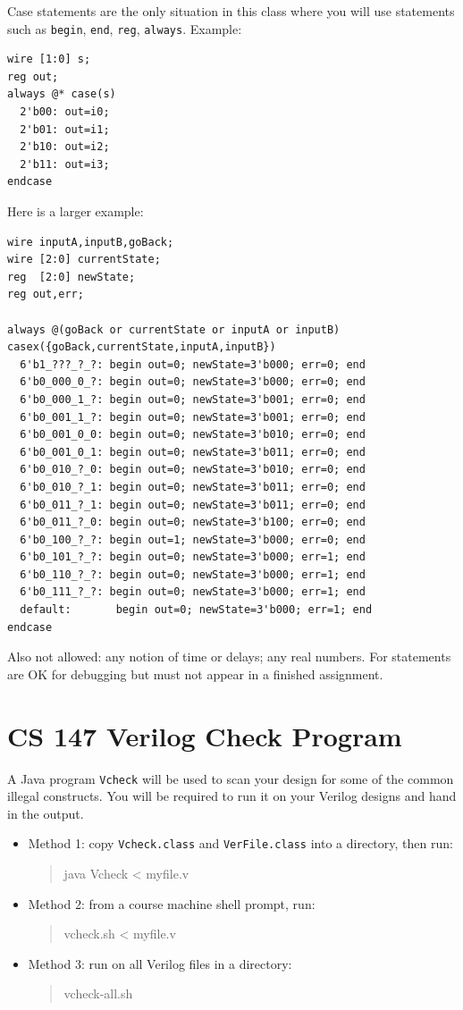 \documentclass[11pt]{article}
\begin{document}
Case statements are the only situation in this class where you will use statements such as
\texttt{begin}, \texttt{end}, \texttt{reg}, \texttt{always}. Example:
\begin{lstlisting}
wire [1:0] s;
reg out;
always @* case(s)
  2'b00: out=i0;
  2'b01: out=i1;
  2'b10: out=i2;
  2'b11: out=i3;
endcase
\end{lstlisting}

Here is a larger example:
\begin{lstlisting}
wire inputA,inputB,goBack;
wire [2:0] currentState;
reg  [2:0] newState;
reg out,err;

always @(goBack or currentState or inputA or inputB)
casex({goBack,currentState,inputA,inputB})
  6'b1_???_?_?: begin out=0; newState=3'b000; err=0; end
  6'b0_000_0_?: begin out=0; newState=3'b000; err=0; end
  6'b0_000_1_?: begin out=0; newState=3'b001; err=0; end
  6'b0_001_1_?: begin out=0; newState=3'b001; err=0; end
  6'b0_001_0_0: begin out=0; newState=3'b010; err=0; end
  6'b0_001_0_1: begin out=0; newState=3'b011; err=0; end
  6'b0_010_?_0: begin out=0; newState=3'b010; err=0; end
  6'b0_010_?_1: begin out=0; newState=3'b011; err=0; end
  6'b0_011_?_1: begin out=0; newState=3'b011; err=0; end
  6'b0_011_?_0: begin out=0; newState=3'b100; err=0; end
  6'b0_100_?_?: begin out=1; newState=3'b000; err=0; end
  6'b0_101_?_?: begin out=0; newState=3'b000; err=1; end
  6'b0_110_?_?: begin out=0; newState=3'b000; err=1; end
  6'b0_111_?_?: begin out=0; newState=3'b000; err=1; end
  default:       begin out=0; newState=3'b000; err=1; end
endcase
\end{lstlisting}

Also not allowed: any notion of time or delays; any real numbers.
For statements are OK for debugging but must not appear in a finished assignment.

\section{CS 147 Verilog Check Program}

A Java program \texttt{Vcheck} will be used to scan your design for some of the common illegal constructs.
You will be required to run it on your Verilog designs and hand in the output.

\begin{itemize}
  \item Method 1: copy \texttt{Vcheck.class} and \texttt{VerFile.class} into a directory, then run:
\begin{quote}\ttfamily
java Vcheck < myfile.v
\end{quote}

  \item Method 2: from a course machine shell prompt, run:
\begin{quote}\ttfamily
vcheck.sh < myfile.v
\end{quote}

  \item Method 3: run on all Verilog files in a directory:
\begin{quote}\ttfamily
vcheck-all.sh
\end{quote}
\end{itemize}
\end{document}
